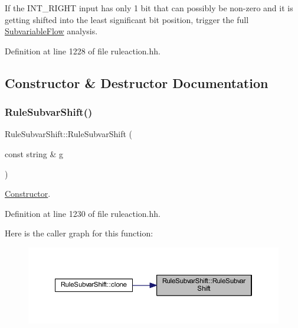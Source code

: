 If the I\+N\+T\+\_\+\+R\+I\+G\+HT input has only 1 bit that can possibly be non-\/zero and it is getting shifted into the least significant bit position, trigger the full \mbox{\hyperlink{class_subvariable_flow}{Subvariable\+Flow}} analysis. 

Definition at line 1228 of file ruleaction.\+hh.



\subsection{Constructor \& Destructor Documentation}
\mbox{\label{class_rule_subvar_shift_adf79aa6e94a9a651b4851c4def77b340}} 
\subsubsection{\texorpdfstring{RuleSubvarShift()}{RuleSubvarShift()}}
{\footnotesize\ttfamily Rule\+Subvar\+Shift\+::\+Rule\+Subvar\+Shift (\begin{DoxyParamCaption}\item[{const string \&}]{g }\end{DoxyParamCaption})\hspace{0.3cm}{\ttfamily [inline]}}



\mbox{\hyperlink{class_constructor}{Constructor}}. 



Definition at line 1230 of file ruleaction.\+hh.

Here is the caller graph for this function\+:
\nopagebreak
\begin{figure}[H]
\begin{center}
\leavevmode
\includegraphics[width=350pt]{class_rule_subvar_shift_adf79aa6e94a9a651b4851c4def77b340_icgraph}
\end{center}
\end{figure}


